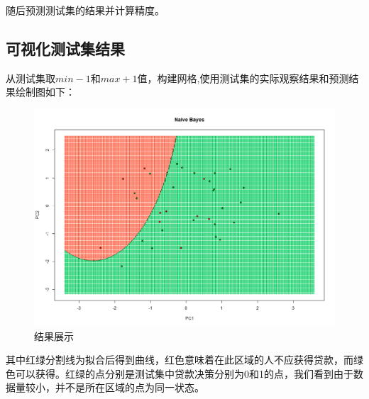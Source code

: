 \documentclass[UTF8]{ctexart}
\begin{document}
随后预测测试集的结果并计算精度。
\subsection{可视化测试集结果}

从测试集取$min-1$和$max+1$值，构建网格,使用测试集的实际观察结果和预测结果绘制图如下：


\begin{figure}[h!]
	\centering
	\includegraphics[width=0.8\linewidth]{Rplot.png}
	\caption{结果展示}
\end{figure}

其中红绿分割线为拟合后得到曲线，红色意味着在此区域的人不应获得贷款，而绿色可以获得。红绿的点分别是测试集中贷款决策分别为0和1的点，我们看到由于数据量较小，并不是所在区域的点为同一状态。
\end{document}
